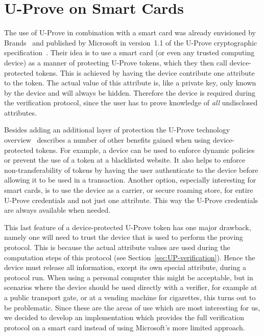 \section{U-Prove on Smart Cards}\label{sec:UP-smartcard}

The use of U-Prove in combination with a smart card was already envisioned by
Brands~\cite{Brands2000} and published by Microsoft in version~1.1 of the
U-Prove cryptographic specification~\cite{U-Prove_Crypto2011}. Their idea is to
use a smart card (or even any trusted computing device) as a manner of
protecting U-Prove tokens, which they then call device-protected tokens. This is
achieved by having the device contribute one attribute to the token. The actual
value of this attribute is, like a private key, only known by the device and
will always be hidden. Therefore the device is required during the verification
protocol, since the user has to prove knowledge of \emph{all} undisclosed
attributes.

Besides adding an additional layer of protection the U-Prove technology
overview~\cite{U-Prove_Overview2011} describes a number of other benefits
gained when using device-protected tokens. For example, a device can be used to
enforce dynamic policies or prevent the use of a token at a blacklisted website.
It also helps to enforce non-transferability of tokens by having the user
authenticate to the device before allowing it to be used in a transaction.
Another option, especially interesting for smart cards, is to use the device as
a carrier, or secure roaming store, for entire U-Prove credentials and not just
one attribute. This way the U-Prove credentials are always available when needed.

This last feature of a device-protected U-Prove token has one major drawback,
namely one will need to trust the device that is used to perform the proving
protocol. This is because the actual attribute values are used during the
computation steps of this protocol (see Section~\ref{sec:UP-verification}).
Hence the device must release all information, except its own special attribute,
during a protocol run. When using a personal computer this might be acceptable,
but in scenarios where the device should be used directly with a verifier, for
example at a public transport gate, or at a vending machine for cigarettes, this
turns out to be problematic. Since these are the areas of use which are most
interesting for us, we decided to develop an implementation which provides the
full verification protocol on a smart card instead of using Microsoft's more
limited approach.


